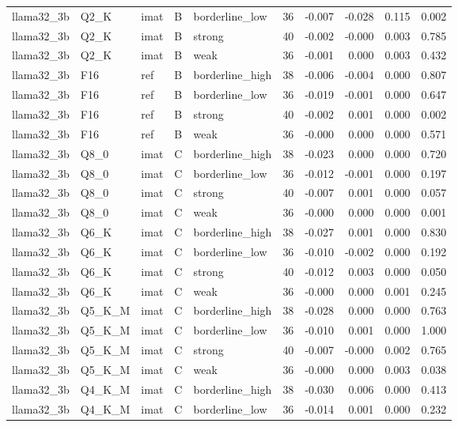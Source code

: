 \begin{tabular}{lllllrrrrr}
llama32\_3b & Q2\_K & imat & B & borderline\_low & 36 & -0.007 & -0.028 & 0.115 & 0.002 \\
llama32\_3b & Q2\_K & imat & B & strong & 40 & -0.002 & -0.000 & 0.003 & 0.785 \\
llama32\_3b & Q2\_K & imat & B & weak & 36 & -0.001 & 0.000 & 0.003 & 0.432 \\
llama32\_3b & F16 & ref & B & borderline\_high & 38 & -0.006 & -0.004 & 0.000 & 0.807 \\
llama32\_3b & F16 & ref & B & borderline\_low & 36 & -0.019 & -0.001 & 0.000 & 0.647 \\
llama32\_3b & F16 & ref & B & strong & 40 & -0.002 & 0.001 & 0.000 & 0.002 \\
llama32\_3b & F16 & ref & B & weak & 36 & -0.000 & 0.000 & 0.000 & 0.571 \\
llama32\_3b & Q8\_0 & imat & C & borderline\_high & 38 & -0.023 & 0.000 & 0.000 & 0.720 \\
llama32\_3b & Q8\_0 & imat & C & borderline\_low & 36 & -0.012 & -0.001 & 0.000 & 0.197 \\
llama32\_3b & Q8\_0 & imat & C & strong & 40 & -0.007 & 0.001 & 0.000 & 0.057 \\
llama32\_3b & Q8\_0 & imat & C & weak & 36 & -0.000 & 0.000 & 0.000 & 0.001 \\
llama32\_3b & Q6\_K & imat & C & borderline\_high & 38 & -0.027 & 0.001 & 0.000 & 0.830 \\
llama32\_3b & Q6\_K & imat & C & borderline\_low & 36 & -0.010 & -0.002 & 0.000 & 0.192 \\
llama32\_3b & Q6\_K & imat & C & strong & 40 & -0.012 & 0.003 & 0.000 & 0.050 \\
llama32\_3b & Q6\_K & imat & C & weak & 36 & -0.000 & 0.000 & 0.001 & 0.245 \\
llama32\_3b & Q5\_K\_M & imat & C & borderline\_high & 38 & -0.028 & 0.000 & 0.000 & 0.763 \\
llama32\_3b & Q5\_K\_M & imat & C & borderline\_low & 36 & -0.010 & 0.001 & 0.000 & 1.000 \\
llama32\_3b & Q5\_K\_M & imat & C & strong & 40 & -0.007 & -0.000 & 0.002 & 0.765 \\
llama32\_3b & Q5\_K\_M & imat & C & weak & 36 & -0.000 & 0.000 & 0.003 & 0.038 \\
llama32\_3b & Q4\_K\_M & imat & C & borderline\_high & 38 & -0.030 & 0.006 & 0.000 & 0.413 \\
llama32\_3b & Q4\_K\_M & imat & C & borderline\_low & 36 & -0.014 & 0.001 & 0.000 & 0.232 \\

\end{tabular}
